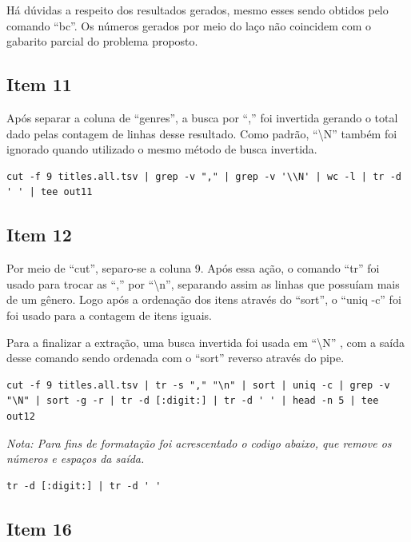 \documentclass[12pt]{article}
\begin{document}
Há dúvidas a respeito dos resultados gerados, mesmo esses sendo obtidos pelo comando ``bc''. Os números gerados por meio do laço não coincidem com o gabarito parcial do problema proposto.

\subsection*{Item 11}

Após separar a coluna de ``genres'', a busca por  ``,''  foi invertida gerando o total dado pelas contagem de linhas desse resultado. Como padrão, ``\textbackslash N'' também foi ignorado quando utilizado o mesmo método de busca invertida.

\begin{verbatim}
cut -f 9 titles.all.tsv | grep -v "," | grep -v '\\N' | wc -l | tr -d ' ' | tee out11
\end{verbatim}

\subsection*{Item 12}

Por meio de ``cut'',  separo-se a coluna 9. Após essa ação, o comando ``tr''  foi usado para trocar as ``,'' por  ``\textbackslash n'', separando assim as linhas que possuíam mais de um gênero.  Logo após a ordenação dos itens através do ``sort'', o ``uniq -c'' foi  foi usado para a contagem de itens iguais.

Para a finalizar a extração, uma busca invertida foi usada em ``\textbackslash N'' , com a saída desse comando sendo ordenada com o ``sort'' reverso através do pipe.

\begin{verbatim}
cut -f 9 titles.all.tsv | tr -s "," "\n" | sort | uniq -c | grep -v "\N" | sort -g -r | tr -d [:digit:] | tr -d ' ' | head -n 5 | tee out12
\end{verbatim}

\textit{Nota: Para fins de formatação foi acrescentado o codigo abaixo, que remove os números e espaços da saída.}

\begin{verbatim}
tr -d [:digit:] | tr -d ' '
\end{verbatim}

\pagebreak

\subsection*{Item 16}
\end{document}
